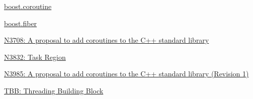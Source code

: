 \begin{thebibliography}{99}

        \href{http://www.boost.org/doc/libs/1_55_0/libs/coroutine/doc/html/index.html}
        {boost.coroutine}

        \href{http://olk.github.io/libs/fiber/doc/html/}
        {boost.fiber}

        \href{http://www.open-std.org/jtc1/sc22/wg21/docs/papers/2013/n3708.pdf}
        {N3708: A proposal to add coroutines to the C++ standard library}

        \href{http://www.open-std.org/jtc1/sc22/wg21/docs/papers/2014/n3832.pdf}
        {N3832: Task Region} 

        \href{http://www.open-std.org/jtc1/sc22/wg21/docs/papers/2014/n3985.pdf}
        {N3985: A proposal to add coroutines to the C++ standard library (Revision 1)}

        \href{https://www.threadingbuildingblocks.org}
        {TBB: Threading Building Block}

\end{thebibliography}
